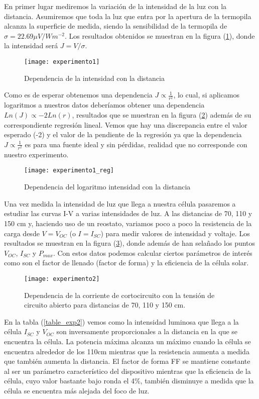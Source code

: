 En primer lugar mediremos la variación de la intensidad de la luz con la distancia. Asumiremos que toda la luz que entra por la apertura de la termopila alcanza la superficie de medida, siendo la sensibilidad de la termopila de $ \sigma = 22.69 \mu V/Wm^{-2}$. Los resultados obtenidos se muestran en la figura (\ref{figure_exp1}), donde la intensidad será $J = V / \sigma$. 


\begin{figure}[t]
	\texttt{[image: experimento1]}
	\caption{Dependencia de la intensidad con la distancia}
	\label{figure_exp1}
\end{figure}

Como es de esperar obtenemos una dependencia $J \propto \frac{1}{r^2}$, lo cual, si aplicamos logaritmos a nuestros datos deberíamos obtener una dependencia $Ln \left(J\right) \propto -2Ln(r)$, resultados que se muestran en la figura (\ref{figure_exp1_reg}) además de su correspondiente regresión lineal. Vemos que hay una discrepancia entre el valor esperado (-2) y el valor de la pendiente de la regresión ya que la dependencia $J \propto \frac{1}{r^2}$ es para una fuente ideal y sin pérdidas, realidad que no corresponde con nuestro experimento.

\begin{figure}[t]
	\texttt{[image: experimento1\_reg]}
	\caption{Dependencia del logaritmo intensidad con la distancia}
	\label{figure_exp1_reg}
\end{figure}

Una vez medida la intensidad de luz que llega a nuestra célula pasaremos a estudiar las curvas I-V a varias intensidades de luz. A las distancias de 70, 110 y 150 cm y, haciendo uso de un reostato, variamos poco a poco la resistencia de la carga desde $V=V_{OC}$ (o $I = I_{SC}$) para medir valores de intensidad y voltaje. Los resultados se muestran en la figura (\ref{figure_exp2}), donde además de han selañado los puntos $V_{OC}$, $I_{SC}$ y $P_{max}$. Con estos datos podemos calcular ciertos parámetros de interés como son el factor de llenado (factor de forma) y la eficiencia de la célula solar.

\begin{figure}[t]
	\texttt{[image: experimento2]}
	\caption{Dependencia de la corriente de cortocircuito con la tensión de circuito abierto para distancias de 70, 110 y 150 cm.}
	\label{figure_exp2}
\end{figure}

En la tabla (\ref{table_exp2}) vemos como la intensidad luminosa que llega a la célula $I_{SC}$ y $V_{OC}$ son inversamente proporcionales a la distancia en la que se encuentra la célula. La potencia máxima alcanza un máximo cuando la célula se encuentra alrededor de los 110cm mientras que la resistencia aumenta a medida que también aumenta la distancia. El factor de forma FF se mantiene constante al ser un parámetro característico del dispositivo mientras que la eficiencia de la célula, cuyo valor bastante bajo ronda el 4\%, también disminuye a medida que la célula se encuentra más alejada del foco de luz.

